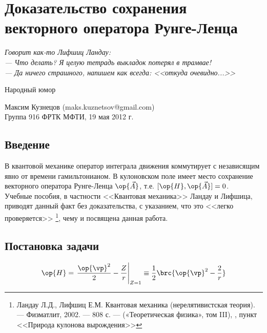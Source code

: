 \appendix

\chapter{Доказательство сохранения векторного оператора Рунге-Ленца}

\renewcommand{\thesection}{}
\renewcommand{\theequation}{\arabic{section}.\arabic{equation}}


\hfill \begin{minipage}[h]{0.45\textwidth}
\textit{
Говорит как-то Лифшиц Ландау:\\ 
--- Что делать? Я целую тетрадь выкладок потерял в трамвае!\\
--- Да ничего страшного, напишем как всегда: <<откуда очевидно...>>}
\begin{flushright}
Народный юмор
\end{flushright}
\end{minipage}

\noindent
Максим Кузнецов (maks.kuznetsov@gmail.com) \\
Группа 916 ФРТК МФТИ, 19 мая 2012 г.

\section*{Введение}

В квантовой механике оператор интеграла движения коммутирует с независящим явно от времени гамильтонианом. В кулоновском поле имеет место сохранение векторного оператора Рунге-Ленца $\op{\vec{A}}$, т.е. $[\op{H},\op{\vec{A}}] = 0$. \\
Учебные пособия, в частности <<Квантовая механика>> Ландау и Лифшица, приводят данный факт без доказательства, с указанием, что это <<легко проверяется>> \footnote{Ландау Л.Д., Лифшиц Е.М. Квантовая механика (нерелятивистская теория). — Физматлит, 2002. — 808 с. — («Теоретическая физика», том III), , пункт <<Природа кулонова вырождения>>}, чему и посвящена данная работа.


\setcounter{section}{1}
\section*{Постановка задачи}

\begin{equation}
\label{eq:1}
\op{H}=\left. \frac{\op{\vp}^2}{2}-\frac{Z}{r} \right|_{Z=1} \equiv \frac{1}{2} \brc{\op{\vp}^2 - \frac{2}{r}}
\end{equation}

